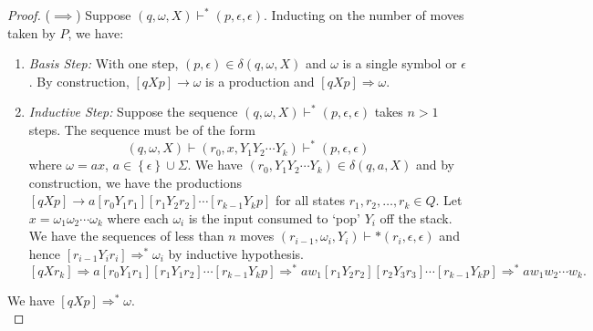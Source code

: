 \begin{proof}
  ($\implies$) Suppose $\left( q,\omega,X \right) \vdash^{*}\left(
  p,\epsilon,\epsilon \right)$. Inducting on the number of moves taken by $P$, we have:
  \begin{enumerate}
    \item \textit{Basis Step:} With one step, $\left( p,\epsilon \right) \in \delta\left( q,\omega,X \right)$ and $\omega$ is a single symbol or $\epsilon$. By construction, $\left[ qXp \right] \to \omega$ is a production and $\left[ qXp \right] \Rightarrow \omega$.
    \item \textit{Inductive Step:} Suppose the sequence $\left( q,\omega, X
      \right) \vdash^{*}\left( p,\epsilon,\epsilon \right) $ takes $n>1$ steps.
      The sequence must be of the form
      \[\left( q,\omega, X \right) \vdash \left( r_0,x,Y_1Y_2\cdots Y_k \right)
      \vdash^{*}\left( p,\epsilon, \epsilon \right)\] 
      where $\omega=ax$, $a\in \left\{ \epsilon \right\} \cup \Sigma$. We have 
      $\left( r_0,Y_1Y_2\cdots Y_k \right)\in \delta\left( q,a,X \right) $ and
      by construction, we have the productions $\left[ qXp \right] \to a\left[
      r_0Y_1r_1 \right] \left[ r_1Y_2r_2 \right] \cdots\left[ r_{k-1}Y_k p
      \right] $ for all states $r_1,r_2,\ldots,r_k\in Q$. Let
      $x=\omega_1\omega_2\cdots\omega_k$ where each $\omega_i$ is the input consumed to
      `pop' $Y_i$ off the stack. We have the sequences of less than $n$ moves $\left( r_{i-1},\omega_i,Y_i \right)
      \vdash{*}\left( r_i,\epsilon,\epsilon \right)$ and hence $\left[
      r_{i-1}Y_ir_i \right] \Rightarrow
      ^{*}\omega_i$ by inductive hypothesis.
      \[\left[ qXr_k \right] \Rightarrow a\left[ r_0Y_1r_1 \right] \left[
      r_1Y_1r_2 \right] \cdots\left[ r_{k-1}Y_kp \right] \Rightarrow
    ^{*}aw_1\left[ r_1Y_2r_2 \right] \left[ r_2Y_3r_3 \right] \cdots\left[
  r_{k-1}Y_kp \right] \Rightarrow ^{*}aw_1w_2\cdots w_k.\]
  \end{enumerate}
  We have $\left[ qXp \right]\Rightarrow ^{*}\omega$.\\
  

\end{proof}
